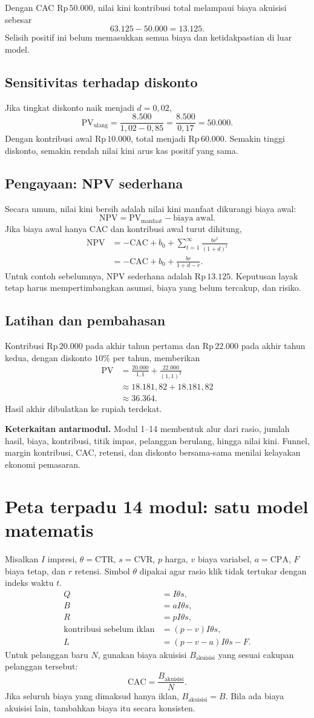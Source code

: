 \documentclass[11pt,a4paper]{article}
\newcommand{\bagian}[1]{\Needspace{5\baselineskip}\subsection{#1}}
\newcommand{\jembatan}[1]{\par\textbf{Keterkaitan antarmodul.} #1\par}
\newcommand{\CTR}{\mathrm{CTR}}
\newcommand{\CVR}{\mathrm{CVR}}
\newcommand{\CPA}{\mathrm{CPA}}
\newcommand{\CAC}{\mathrm{CAC}}
\newcommand{\PV}{\mathrm{PV}}
\newcommand{\NPV}{\mathrm{NPV}}
\newcommand{\rp}[1]{\ensuremath{\mathrm{Rp}\,#1}}
\begin{document}
Dengan CAC \rp{50.000}, nilai kini kontribusi total melampaui biaya akuisisi sebesar
\[
63.125-50.000=13.125.
\]
Selisih positif ini belum memasukkan semua biaya dan ketidakpastian di luar model.

\bagian{Sensitivitas terhadap diskonto}
Jika tingkat diskonto naik menjadi \(d=0{,}02\),
\[
\PV_{\text{ulang}}=\frac{8.500}{1{,}02-0{,}85}
=\frac{8.500}{0{,}17}=50.000.
\]
Dengan kontribusi awal \rp{10.000}, total menjadi \rp{60.000}. Semakin tinggi diskonto, semakin rendah nilai kini arus kas positif yang sama.

\bagian{Pengayaan: NPV sederhana}
Secara umum, nilai kini bersih adalah nilai kini manfaat dikurangi biaya awal:
\[
\NPV=\PV_{\text{manfaat}}-\text{biaya awal}.
\]
Jika biaya awal hanya CAC dan kontribusi awal turut dihitung,
\[
\begin{aligned}
\NPV&=-\CAC+b_0+\sum_{t=1}^{\infty}\frac{br^t}{(1+d)^t}\\
&=-\CAC+b_0+\frac{br}{1+d-r}.
\end{aligned}
\]
Untuk contoh sebelumnya, NPV sederhana adalah \rp{13.125}. Keputusan layak tetap harus mempertimbangkan asumsi, biaya yang belum tercakup, dan risiko.

\bagian{Latihan dan pembahasan}
Kontribusi \rp{20.000} pada akhir tahun pertama dan \rp{22.000} pada akhir tahun kedua, dengan diskonto \(10\%\) per tahun, memberikan
\[
\begin{aligned}
\PV&=\frac{20.000}{1{,}1}+\frac{22.000}{(1{,}1)^2}\\
&\approx18.181{,}82+18.181{,}82\\
&\approx36.364.
\end{aligned}
\]
Hasil akhir dibulatkan ke rupiah terdekat.
\jembatan{Modul 1--14 membentuk alur dari rasio, jumlah hasil, biaya, kontribusi, titik impas, pelanggan berulang, hingga nilai kini. Funnel, margin kontribusi, CAC, retensi, dan diskonto bersama-sama menilai kelayakan ekonomi pemasaran.}

\clearpage
\section{Peta terpadu 14 modul: satu model matematis}
Misalkan \(I\) impresi, \(\theta=\CTR\), \(s=\CVR\), \(p\) harga, \(v\) biaya variabel, \(a=\CPA\), \(F\) biaya tetap, dan \(r\) retensi. Simbol \(\theta\) dipakai agar rasio klik tidak tertukar dengan indeks waktu \(t\).
\[
\begin{aligned}
Q&=I\theta s,\\
B&=aI\theta s,\\
R&=pI\theta s,\\
\text{kontribusi sebelum iklan}&=(p-v)I\theta s,\\
L&=(p-v-a)I\theta s-F.
\end{aligned}
\]
Untuk pelanggan baru \(N\), gunakan biaya akuisisi \(B_{\text{akuisisi}}\) yang sesuai cakupan pelanggan tersebut:
\[
\CAC=\frac{B_{\text{akuisisi}}}{N}.
\]
Jika seluruh biaya yang dimaksud hanya iklan, \(B_{\text{akuisisi}}=B\). Bila ada biaya akuisisi lain, tambahkan biaya itu secara konsisten.
\end{document}

